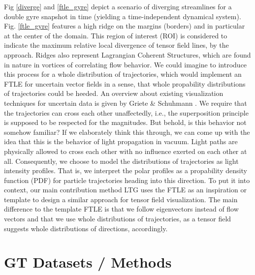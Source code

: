 \documentclass{scrartcl}
\begin{document}
Fig \ref{diverge} and \ref{ftle_gyre} depict a scenario of diverging streamlines for a double gyre snapshot in time (yielding a time-independent dynamical system). Fig. \ref{ftle_gyre} features a high ridge on the margins (borders) and in particular at the center of the domain. This region of interest (ROI) is considered to indicate the maximum relative local divergence of tensor field lines, by the approach. Ridges also represent Lagrangian Coherent Structures, which are found in nature in vortices of correlating flow behavior.  We could imagine to introduce this process for a whole distribution of trajectories, which would implement an FTLE for uncertain vector fields in a sense, that whole propability distributions of trajectories could be heeded. An overview about existing visualization techniques for uncertain data is given by Griete \& Schuhmann \cite{griete}. We require that the trajectories can cross each other unaffectedly, i.e., the superposition principle is supposed to be respected for the magnitudes. But behold, is this behavior not somehow familiar? If we elaborately think this through, we can come up with the idea that this is the behavior of light propagation in vacuum. Light paths are physically allowed to cross each other with no influence exerted on each other at all. Consequently, we choose to model the distributions of trajectories as light intensity profiles. That is, we interpret the polar profiles as a propability density function (PDF) for particle trajectories heading into this direction. To put it into context, our main contribution method LTG uses the FTLE as an inspiration or template to design a similar approach for tensor field visualization. The main difference to the template FTLE is that we follow eigenvectors instead of flow vectors and that we use whole distributions of trajectories, as a tensor field suggests whole distributions of directions, accordingly.

\section{GT Datasets / Methods}
\label{sec:gt}
\end{document}
